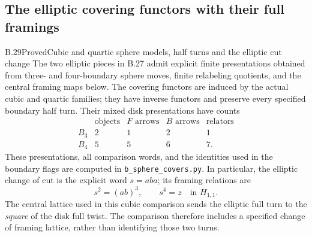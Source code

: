 
\subsection{The elliptic covering functors with their full framings}

\begin{result}{B.29}{Proved}{Cubic and quartic sphere models, half turns and the elliptic cut change}
The two elliptic pieces in B.27 admit explicit finite presentations
obtained from three- and four-boundary sphere moves, finite
relabeling quotients, and the central framing maps below.  The
covering functors are induced by the actual cubic and quartic
families; they have inverse functors and preserve every specified
boundary half turn.  Their mixed disk presentations have counts
\[
\begin{array}{c|rrrr}
 &\text{objects}&F\text{ arrows}&B\text{ arrows}&\text{relators}\\\hline
 B_3&2&1&2&1\\
 B_4&5&5&6&7.
\end{array}                                                     \tag{B.88}
\]
These presentations, all comparison words, and the identities used
in the boundary flags are computed in
\texttt{b\_sphere\_covers.py}.  In particular, the elliptic change
of cut is the explicit word $s=aba$; its framing relations are
\[
 s^2=(ab)^3,\qquad s^4=z\quad\text{in }H_{1,1}.                 \tag{B.89}
\]
The central lattice used in this cubic comparison sends the
elliptic full turn to the \emph{square} of the disk full twist.
The comparison therefore includes a specified change of framing
lattice, rather than identifying those two turns.
\end{result}
